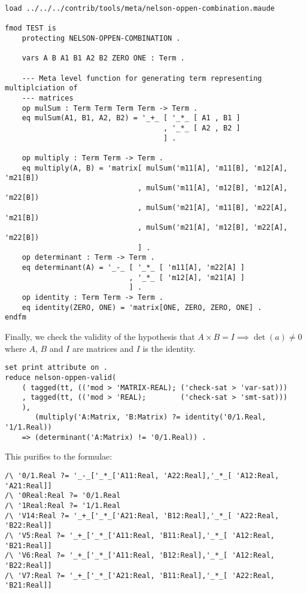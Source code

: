 \documentclass[]{article}
\begin{document}
\begin{verbatim}
load ../../../contrib/tools/meta/nelson-oppen-combination.maude

fmod TEST is
    protecting NELSON-OPPEN-COMBINATION .

    vars A B A1 B1 A2 B2 ZERO ONE : Term .

    --- Meta level function for generating term representing multiplciation of
    --- matrices
    op mulSum : Term Term Term Term -> Term .
    eq mulSum(A1, B1, A2, B2) = '_+_ [ '_*_ [ A1 , B1 ]
                                     , '_*_ [ A2 , B2 ]
                                     ] .

    op multiply : Term Term -> Term .
    eq multiply(A, B) = 'matrix[ mulSum('m11[A], 'm11[B], 'm12[A], 'm21[B])
                               , mulSum('m11[A], 'm12[B], 'm12[A], 'm22[B])
                               , mulSum('m21[A], 'm11[B], 'm22[A], 'm21[B])
                               , mulSum('m21[A], 'm12[B], 'm22[A], 'm22[B])
                               ] .
    op determinant : Term -> Term .
    eq determinant(A) = '_-_ [ '_*_ [ 'm11[A], 'm22[A] ]
                             , '_*_ [ 'm12[A], 'm21[A] ]
                             ] .
    op identity : Term Term -> Term .
    eq identity(ZERO, ONE) = 'matrix[ONE, ZERO, ZERO, ONE] .
endfm
\end{verbatim}

Finally, we check the validity of the hypothesis that
\(A \times B = I \implies \det(a) \ne 0\) where \(A\), \(B\) and \(I\)
are matrices and \(I\) is the identity.

\begin{verbatim}
set print attribute on .
reduce nelson-oppen-valid(
    ( tagged(tt, (('mod > 'MATRIX-REAL); ('check-sat > 'var-sat)))
    , tagged(tt, (('mod > 'REAL);        ('check-sat > 'smt-sat)))
    ),
       (multiply('A:Matrix, 'B:Matrix) ?= identity('0/1.Real, '1/1.Real))
    => (determinant('A:Matrix) != '0/1.Real)) .
\end{verbatim}

This purifies to the formulae:

\begin{verbatim}
/\ '0/1.Real ?= '_-_['_*_['A11:Real, 'A22:Real],'_*_[ 'A12:Real, 'A21:Real]]
/\ '0Real:Real ?= '0/1.Real
/\ '1Real:Real ?= '1/1.Real 
/\ 'V14:Real ?= '_+_['_*_['A21:Real, 'B12:Real],'_*_[ 'A22:Real, 'B22:Real]] 
/\ 'V5:Real ?= '_+_['_*_['A11:Real, 'B11:Real],'_*_[ 'A12:Real, 'B21:Real]] 
/\ 'V6:Real ?= '_+_['_*_['A11:Real, 'B12:Real],'_*_[ 'A12:Real, 'B22:Real]] 
/\ 'V7:Real ?= '_+_['_*_['A21:Real, 'B11:Real],'_*_[ 'A22:Real, 'B21:Real]] 
\end{verbatim}
\end{document}

